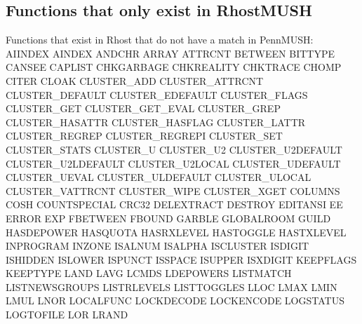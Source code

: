 \documentclass[letterpaper,10pt,english]{sphinxmanual}
\begin{document}
\subsection{Functions that only exist in RhostMUSH}
\label{\detokenize{differences:functions-that-only-exist-in-rhostmush}}
\sphinxAtStartPar
Functions that exist in Rhost that do not have a match in PennMUSH:
AIINDEX                      AINDEX                        ANDCHR
ARRAY                        ATTRCNT                       BETWEEN
BITTYPE                      CANSEE                        CAPLIST
CHKGARBAGE                   CHKREALITY                    CHKTRACE
CHOMP                        CITER                         CLOAK
CLUSTER\_ADD                  CLUSTER\_ATTRCNT               CLUSTER\_DEFAULT
CLUSTER\_EDEFAULT             CLUSTER\_FLAGS                 CLUSTER\_GET
CLUSTER\_GET\_EVAL             CLUSTER\_GREP                  CLUSTER\_HASATTR
CLUSTER\_HASFLAG              CLUSTER\_LATTR                 CLUSTER\_REGREP
CLUSTER\_REGREPI              CLUSTER\_SET                   CLUSTER\_STATS
CLUSTER\_U                    CLUSTER\_U2                    CLUSTER\_U2DEFAULT
CLUSTER\_U2LDEFAULT           CLUSTER\_U2LOCAL               CLUSTER\_UDEFAULT
CLUSTER\_UEVAL                CLUSTER\_ULDEFAULT             CLUSTER\_ULOCAL
CLUSTER\_VATTRCNT             CLUSTER\_WIPE                  CLUSTER\_XGET
COLUMNS                      COSH                          COUNTSPECIAL
CRC32                        DELEXTRACT                    DESTROY
EDITANSI                     EE                            ERROR
EXP                          FBETWEEN                      FBOUND
GARBLE                       GLOBALROOM                    GUILD
HASDEPOWER                   HASQUOTA                      HASRXLEVEL
HASTOGGLE                    HASTXLEVEL                    INPROGRAM
INZONE                       ISALNUM                       ISALPHA
ISCLUSTER                    ISDIGIT                       ISHIDDEN
ISLOWER                      ISPUNCT                       ISSPACE
ISUPPER                      ISXDIGIT                      KEEPFLAGS
KEEPTYPE                     LAND                          LAVG
LCMDS                        LDEPOWERS                     LISTMATCH
LISTNEWSGROUPS               LISTRLEVELS                   LISTTOGGLES
LLOC                         LMAX                          LMIN
LMUL                         LNOR                          LOCALFUNC
LOCKDECODE                   LOCKENCODE                    LOGSTATUS
LOGTOFILE                    LOR                           LRAND
\end{document}
